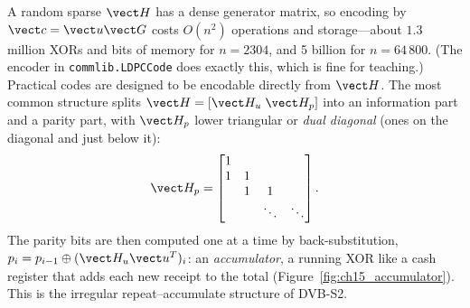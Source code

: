 A random sparse $\vect H$ has a dense generator matrix, so encoding by $\vect c=\vect u\vect G$ costs
$O(n^2)$ operations and storage---about $1.3$ million XORs and bits of memory for $n=2304$, and 5
billion for $n=64\,800$. (The encoder in \texttt{commlib.LDPCCode} does exactly this, which is fine
for teaching.) Practical codes are designed to be encodable directly from $\vect H$. The most common
structure splits $\vect H=[\vect H_u\;\vect H_p]$ into an information part and a parity part, with
$\vect H_p$ lower triangular or \emph{dual diagonal} (ones on the diagonal and just below it):
\begin{equation}
\vect H_p=\begin{bmatrix}1&&&\\1&1&&\\&1&1&\\&&\ddots&\ddots\end{bmatrix}.
\end{equation}
The parity bits are then computed one at a time by back-substitution, $p_i=p_{i-1}\oplus
(\vect H_u\vect u^T)_i$: an \emph{accumulator}, a running XOR like a cash register that adds each new
receipt to the total (Figure~\ref{fig:ch15_accumulator}). This is the irregular repeat--accumulate
structure of DVB-S2.

